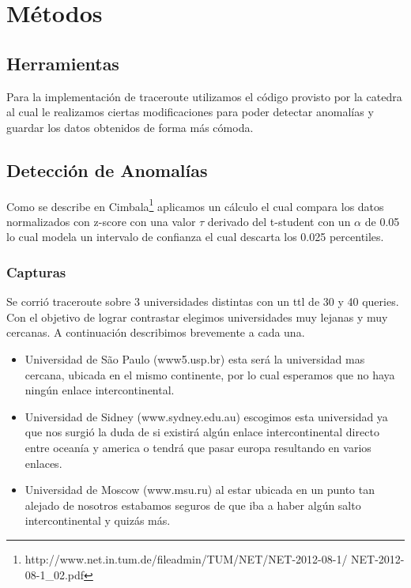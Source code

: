 \section{Métodos}

\subsection*{Herramientas}
Para la implementación de traceroute utilizamos el código provisto por la catedra al cual le realizamos ciertas modificaciones para poder detectar anomalías y guardar los datos obtenidos de forma más cómoda.

\subsection*{Detección de Anomalías}

Como se describe en Cimbala\footnote{http://www.net.in.tum.de/fileadmin/TUM/NET/NET-2012-08-1/
NET-2012-08-1\_02.pdf} aplicamos un cálculo el cual compara los datos normalizados con z-score con una valor $\tau$ derivado del t-student con un $\alpha$ de 0.05 lo cual modela un intervalo de confianza el cual descarta los 0.025 percentiles.


\subsubsection*{Capturas}
Se corrió traceroute sobre 3 universidades distintas con un ttl de 30 y 40 queries. Con el objetivo de lograr contrastar elegimos universidades muy lejanas y muy cercanas. A continuación describimos brevemente a cada una.

\begin{itemize}
	\item Universidad de São Paulo (www5.usp.br) esta será la universidad mas cercana, ubicada en el mismo continente, por lo cual esperamos que no haya ningún enlace intercontinental.
	\item Universidad de Sidney (www.sydney.edu.au) escogimos esta universidad ya que nos surgió la duda de si existirá algún enlace intercontinental directo entre oceanía y america o tendrá que pasar europa resultando en varios enlaces.
	\item Universidad de Moscow (www.msu.ru) al estar ubicada en un punto tan alejado de nosotros estabamos seguros de que iba a haber algún salto intercontinental y quizás más.
\end{itemize}